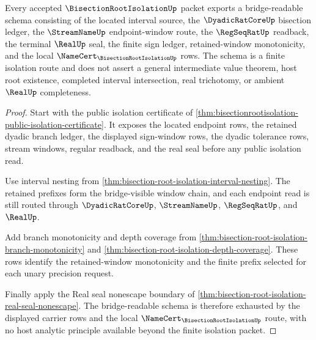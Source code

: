 \begin{theorem}
\label{thm:bisection-root-isolation-bridge-schema}
Every accepted $\BisectionRootIsolationUp$ packet exports a bridge-readable schema consisting of the located interval source, the $\DyadicRatCoreUp$ bisection ledger, the $\StreamNameUp$ endpoint-window route, the $\RegSeqRatUp$ readback, the terminal $\RealUp$ seal, the finite sign ledger, retained-window monotonicity, and the local $\NameCert_{\BisectionRootIsolationUp}$ rows. The schema is a finite isolation route and does not assert a general intermediate value theorem, host root existence, completed interval intersection, real trichotomy, or ambient $\RealUp$ completeness.
\end{theorem}
\begin{proof}
Start with the public isolation certificate of \autoref{thm:bisectionrootisolation-public-isolation-certificate}. It exposes the located endpoint rows, the retained dyadic branch ledger, the displayed sign-window rows, the dyadic tolerance rows, stream windows, regular readback, and the real seal before any public isolation read.

Use interval nesting from \autoref{thm:bisection-root-isolation-interval-nesting}. The retained prefixes form the bridge-visible window chain, and each endpoint read is still routed through $\DyadicRatCoreUp$, $\StreamNameUp$, $\RegSeqRatUp$, and $\RealUp$.

Add branch monotonicity and depth coverage from \autoref{thm:bisection-root-isolation-branch-monotonicity} and \autoref{thm:bisection-root-isolation-depth-coverage}. These rows identify the retained-window monotonicity and the finite prefix selected for each unary precision request.

Finally apply the Real seal nonescape boundary of \autoref{thm:bisection-root-isolation-real-seal-nonescape}. The bridge-readable schema is therefore exhausted by the displayed carrier rows and the local $\NameCert_{\BisectionRootIsolationUp}$ route, with no host analytic principle available beyond the finite isolation packet.
\end{proof}


